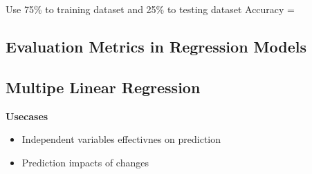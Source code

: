 Use 75\% to training dataset and 25\% to testing dataset
Accuracy = %

\subsection{Evaluation Metrics in Regression Models}


\subsection{Multipe Linear Regression}

\textbf{Usecases}
\begin{itemize}
\item Independent variables effectivnes on prediction
\item Prediction impacts of changes
\end{itemize}





